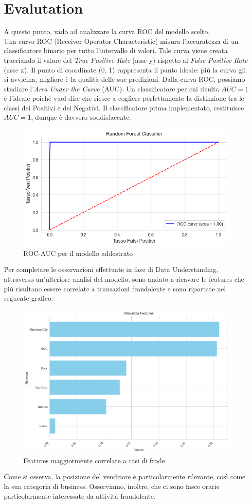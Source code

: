 \documentclass[]{article}
\begin{document}
\section{Evalutation}
    A questo punto, vado ad analizzare la curva ROC del modello scelto.\\
    Una curva ROC (Receiver Operator Characteristic) misura l'accuratezza di un classificatore binario per tutto l'intervallo di valori. Tale curva viene creata tracciando il valore del \textit{True Positive Rate} (asse y) rispetto al \textit{False Positive Rate} (asse x). Il punto di coordinate (0, 1) rappresenta il punto ideale: più la curva gli si avvicina, migliore è la qualità delle sue predizioni. Dalla curva ROC, possiamo studiare l'\textit{Area Under the Curve} (AUC). Un classificatore per cui risulta $AUC=1$ è l'ideale poiché vuol dire che riesce a cogliere perfettamente la distinzione tra le classi dei Positivi e dei Negativi.
    Il classificatore prima implementato, restituisce $AUC=1$, dunque è davvero soddisfacente.
    \begin{figure}[H]
            \centering
            \includegraphics[width=.55\textwidth]{img/RF-ROC-AUC.png}
            \caption[short]{ROC-AUC per il modello addestrato}
    \end{figure}
    Per completare le osservazioni effettuate in fase di Data Understanding, attraverso un'ulteriore analisi del modello, sono andato a ricavare le features che più risultano essere correlate a transazioni fraudolente e sono riportate nel seguente grafico:
    \begin{figure}[H]
            \centering
            \includegraphics[width=.65\textwidth]{img/RilevanzaFeatures.png}
            \caption[short]{Features maggiormente correlate a casi di frode}
    \end{figure}
    Come si osserva, la posizione del venditore è particolarmente rilevante, così come la sua categoria di business. Osserviamo, inoltre, che ci sono fasce orarie particolarmente interessate da attività fraudolente. \\
\end{document}
